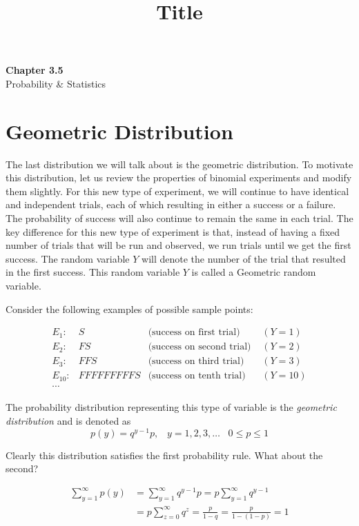 \documentclass[11pt]{article}
\theoremstyle{definition}
\begin{document}
\title{Title}

\thispagestyle{empty}

\begin{center}
{\LARGE \bf Chapter 3.5}\\
{\large Probability \& Statistics}
\end{center}

\section{Geometric Distribution}

The last distribution we will talk about is the geometric distribution. To motivate this distribution, let us review the properties of binomial experiments and modify them slightly. For this new type of experiment, we will continue to have identical and independent trials, each of which resulting in either a success or a failure. The probability of success will also continue to remain the same in each trial. The key difference for this new type of experiment is that, instead of having a fixed number of trials that will be run and observed, we run trials until we get the first success. The random variable $Y$ will denote the number of the trial that resulted in the first success. This random variable $Y$ is called a Geometric random variable.

Consider the following examples of possible sample points:

$$
	\begin{aligned}
		E_1: & S & \text{(success on first trial) } & (Y=1) \\
		E_2: & FS & \text{(success on second trial) } & (Y=2) \\
		E_3: & FFS & \text{(success on third trial) } & (Y=3) \\
		E_{10}: & FFFFFFFFFS & \text{(success on tenth trial) } & (Y=10) \\
		\cdots & & &
	\end{aligned}
$$

\begin{shaded}
	The probability distribution representing this type of variable is the \textit{geometric distribution} and is denoted as
	$$
		p(y) = q^{y-1}p, \;\;\; y=1, 2, 3, \ldots \;\;\; 0 \leq p \leq 1
	$$
\end{shaded}

Clearly this distribution satisfies the first probability rule. What about the second?

$$
	\begin{aligned}
		\sum_{y=1}^\infty p(y) & = \sum_{y=1}^\infty q^{y-1}p = p \sum_{y=1}^\infty q^{y-1} \\
		& = p \sum_{z=0}^\infty q^z = \frac{p}{1-q} = \frac{p}{1-(1-p)} = 1
	\end{aligned}
$$
\end{document}
